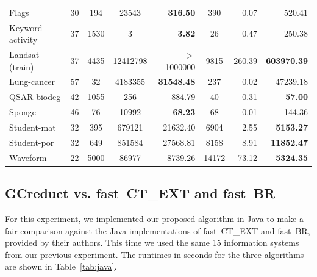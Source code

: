 \documentclass[authoryear,preprint,review,12pt]{elsarticle}
\begin{document}
\begin{table}[!htb]
\begin{tabular}{|l|c|c|c|r|c|r|r|}
			Flags                     & 30         & 194       & 23543    & \textbf{316.50}   & 390   & 0.07        & 520.41             \\
			Keyword-activity          & 37         & 1530      & 3        & \textbf{3.82}     & 26    & 0.47        & 250.38             \\
			Landsat (train)           & 37         & 4435      & 12412798 & $>$1000000        & 9815  & 260.39      & \textbf{603970.39} \\
			Lung-cancer               & 57         & 32        & 4183355  & \textbf{31548.48} & 237   & 0.02        & 47239.18           \\
			QSAR-biodeg               & 42         & 1055      & 256      &  884.79           & 40    & 0.31        & \textbf{57.00}     \\
			Sponge                    & 46         & 76        & 10992    & \textbf{68.23}    & 68    & 0.01        & 144.36             \\
			Student-mat & 32          & 395        & 679121    & 21632.40 & 6904  & 2.55      & \textbf{5153.27}   \\
			Student-por & 32         & 649         & 851584    & 27568.81 & 8158  & 8.91      & \textbf{11852.47}  \\
			Waveform    & 22         & 5000        & 86977     & 8739.26  & 14172 & 73.12     & \textbf{5324.35}   \\				
			\hline
    	\end{tabular}
    \end{table}
    

\subsection{GCreduct vs. fast--CT\_EXT and fast--BR}\label{sub:java}
	
	For this experiment, we implemented our proposed algorithm in Java to make a fair comparison against the Java implementations of fast--CT\_EXT and fast--BR, provided by their authors. This time we used the same 15 information systems from our previous experiment. The runtimes in seconds for the three algorithms are shown in Table~\ref{tab:java}. 
	
\end{document}
